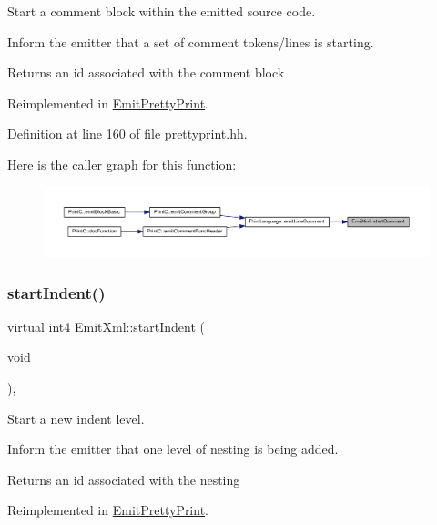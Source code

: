 Start a comment block within the emitted source code. 

Inform the emitter that a set of comment tokens/lines is starting. \begin{DoxyReturn}{Returns}
an id associated with the comment block 
\end{DoxyReturn}


Reimplemented in \mbox{\hyperlink{class_emit_pretty_print_a922f3833eb9fd5f0aa04f2d0fe3e3540}{Emit\+Pretty\+Print}}.



Definition at line 160 of file prettyprint.\+hh.

Here is the caller graph for this function\+:
\nopagebreak
\begin{figure}[H]
\begin{center}
\leavevmode
\includegraphics[width=350pt]{class_emit_xml_a4b5198be36bbd5b170206affef1d21d0_icgraph}
\end{center}
\end{figure}
\mbox{\label{class_emit_xml_ae9ed06a8d8049b22634eb06799d3ec3d}} 
\subsubsection{\texorpdfstring{startIndent()}{startIndent()}}
{\footnotesize\ttfamily virtual int4 Emit\+Xml\+::start\+Indent (\begin{DoxyParamCaption}\item[{void}]{ }\end{DoxyParamCaption})\hspace{0.3cm}{\ttfamily [inline]}, {\ttfamily [virtual]}}



Start a new indent level. 

Inform the emitter that one level of nesting is being added. \begin{DoxyReturn}{Returns}
an id associated with the nesting 
\end{DoxyReturn}


Reimplemented in \mbox{\hyperlink{class_emit_pretty_print_a3c08c45b256a71e9e93864dd7ef4860b}{Emit\+Pretty\+Print}}.



